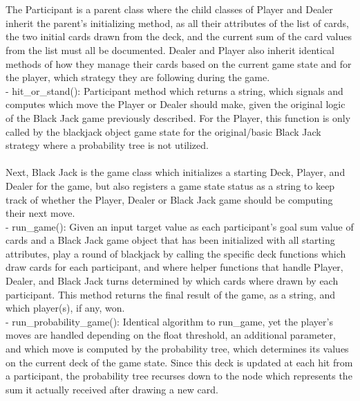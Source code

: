 \documentclass[fontsize=11pt]{article}
\begin{document}
\\\\
The Participant is a parent class where the child classes of Player and Dealer inherit the parent’s initializing method, as all their attributes of the list of cards, the two initial cards drawn from the deck, and the current sum of the card values from the list must all be documented. Dealer and Player also inherit identical methods of how they manage their cards based on the current game state and for the player, which strategy they are following during the game.
\\
- hit\_or\_stand(): Participant method which returns a string, which signals and computes which move the Player or Dealer should make, given the original logic of the Black Jack game previously described. For the Player, this function is only called by the blackjack object game state for the original/basic Black Jack strategy where a probability tree is not utilized.
\\\\
Next, Black Jack is the game class which initializes a starting Deck, Player, and Dealer for the game, but also registers a game state status as a string to keep track of whether the Player, Dealer or Black Jack game should be computing their next move.
\\
- run\_game(): Given an input target value as each participant's goal sum value of cards and a Black Jack game object that has been initialized with all starting attributes, play a round of blackjack by calling the specific deck functions which draw cards for each participant, and where helper functions that handle Player, Dealer, and Black Jack turns determined by which cards where drawn by each participant. This method returns the final result of the game, as a string, and which player(s), if any, won.
\\
- run\_probability\_game(): Identical algorithm to run\_game, yet the player’s moves are handled depending on the float threshold, an additional parameter, and which move is computed by the probability tree, which determines its values on the current deck of the game state. Since this deck is updated at each hit from a participant, the probability tree recurses down to the node which represents the sum it actually received after drawing a new card.
\\\\
\end{document}
